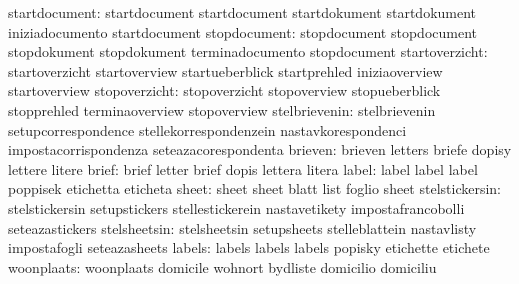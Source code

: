                    startdocument: startdocument                    startdocument
                                  startdokument                    startdokument
                                  iniziadocumento                  startdocument
                    stopdocument: stopdocument                     stopdocument
                                  stopdokument                     stopdokument
                                  terminadocumento                 stopdocument
                  startoverzicht: startoverzicht                   startoverview
                                  startueberblick                  startprehled
                                  iniziaoverview                   startoverview %
                   stopoverzicht: stopoverzicht                    stopoverview
                                  stopueberblick                   stopprehled
                                  terminaoverview                  stopoverview
                   stelbrievenin: stelbrievenin                    setupcorrespondence
                                  stellekorrespondenzein           nastavkorespondenci
                                  impostacorrispondenza            seteazacorespondenta
                         brieven: brieven                          letters
                                  briefe                           dopisy
                                  lettere                          litere
                           brief: brief                            letter
                                  brief                            dopis
                                  lettera                          litera
                           label: label                            label
                                  label                            poppisek
                                  etichetta                        eticheta
                           sheet: sheet                            sheet
                                  blatt                            list
                                  foglio                           sheet
                  stelstickersin: stelstickersin                   setupstickers
                                  stellestickerein                 nastavetikety
                                  impostafrancobolli               seteazastickers %
                    stelsheetsin: stelsheetsin                     setupsheets
                                  stelleblattein                   nastavlisty
                                  impostafogli                     seteazasheets
                          labels: labels                           labels
                                  labels                           popisky
                                  etichette                        etichete
                      woonplaats: woonplaats                       domicile
                                  wohnort                          bydliste
                                  domicilio                        domiciliu

\stopcommands


\stoplogginginterface

\endinput
